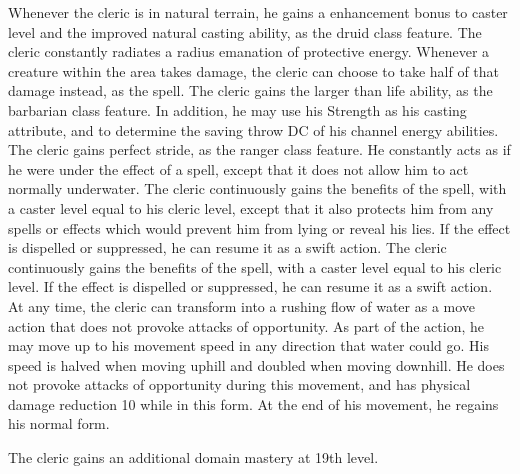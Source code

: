  Whenever the cleric is in natural terrain, he gains a  enhancement bonus to caster level and the improved natural casting ability, as the druid class feature.
 The cleric constantly radiates a \areamed radius emanation of protective energy. Whenever a creature within the area takes damage, the cleric can choose to take half of that damage instead, as the  spell.
 The cleric gains the larger than life ability, as the barbarian class feature. In addition, he may use his Strength as his casting attribute, and to determine the saving throw DC of his channel energy abilities.
 The cleric gains perfect stride, as the ranger class feature. He constantly acts as if he were under the effect of a  spell, except that it does not allow him to act normally underwater.
 The cleric continuously gains the benefits of the  spell, with a caster level equal to his cleric level, except that it also protects him from any spells or effects which would prevent him from lying or reveal his lies. If the effect is dispelled or suppressed, he can resume it as a swift action.
 The cleric continuously gains the benefits of the  spell, with a caster level equal to his cleric level. If the effect is dispelled or suppressed, he can resume it as a swift action.
 At any time, the cleric can transform into a rushing flow of water as a move action that does not provoke attacks of opportunity. As part of the action, he may move up to his movement speed in any direction that water could go. His speed is halved when moving uphill and doubled when moving downhill. He does not provoke attacks of opportunity during this movement, and has physical damage reduction 10 while in this form. At the end of his movement, he regains his normal form.

\par The cleric gains an additional domain mastery at 19th level.

